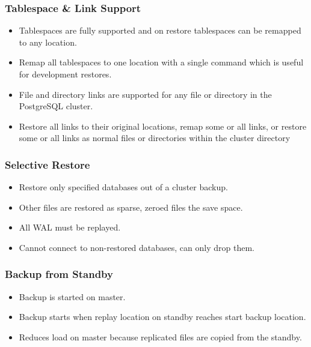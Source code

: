 \begin{frame}
    \frametitle{Tablespace \& Link Support}

    \begin{itemize}
        \item Tablespaces are fully supported and on restore tablespaces can be remapped to any location.\pause
        \item Remap all tablespaces to one location with a single command which is useful for development restores.\pause
    \end{itemize}

    \begin{itemize}
        \item File and directory links are supported for any file or directory in the PostgreSQL cluster.\pause
        \item Restore all links to their original locations, remap some or all links, or restore some or all links as normal files or directories within the cluster directory
    \end{itemize}
\end{frame}

\begin{frame}
    \frametitle{Selective Restore}

    \begin{itemize}
        \item Restore only specified databases out of a cluster backup.\pause
        \item Other files are restored as sparse, zeroed files the save space.\pause
        \item All WAL must be replayed.\pause
        \item Cannot connect to non-restored databases, can only drop them.\pause
    \end{itemize}
\end{frame}

\begin{frame}
    \frametitle{Backup from Standby}

    \begin{itemize}
        \item Backup is started on master.\pause
        \item Backup starts when replay location on standby reaches start backup location.\pause
        \item Reduces load on master because replicated files are copied from the standby.
    \end{itemize}
\end{frame}

